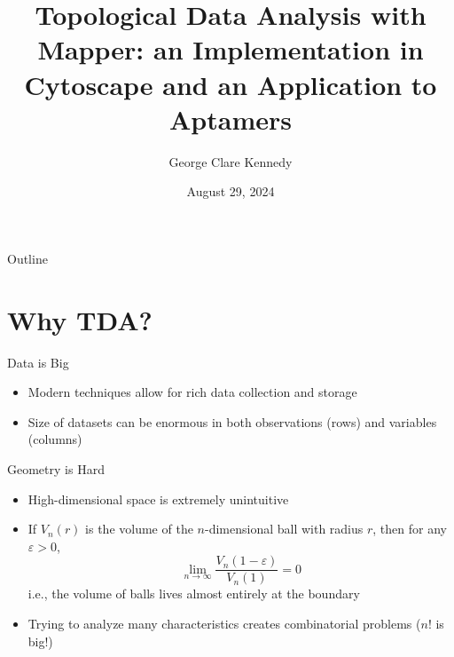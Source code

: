 \documentclass{beamer}
\title{Topological Data Analysis with Mapper: an Implementation in Cytoscape and an Application to Aptamers}
\date{August 29, 2024}
\author{George Clare Kennedy}
\institute{University of Iowa}
\begin{document}
\begin{frame}
  \titlepage
\end{frame}
\begin{frame}{Outline}
  \tableofcontents[hideallsubsections]
\end{frame}

\section{Why TDA?}

\begin{frame}{Data is Big}
  \begin{itemize}
    \item Modern techniques allow for rich data collection and storage
    \item Size of datasets can be enormous in both observations (rows) and variables (columns)
  \end{itemize}
\end{frame}

\begin{frame}{Geometry is Hard}
  \begin{itemize}
    \item High-dimensional space is extremely unintuitive
    \item If $V_n(r)$ is the volume of the $n$-dimensional ball with radius $r$, then for any $\varepsilon>0$, $$\lim_{n\to\infty}\frac{V_n(1-\varepsilon)}{V_n(1)}=0$$ i.e., the volume of balls lives almost entirely at the boundary
    \item Trying to analyze many characteristics creates combinatorial problems ($n!$ is big!)
  \end{itemize}
  
\end{frame}
\end{document}
